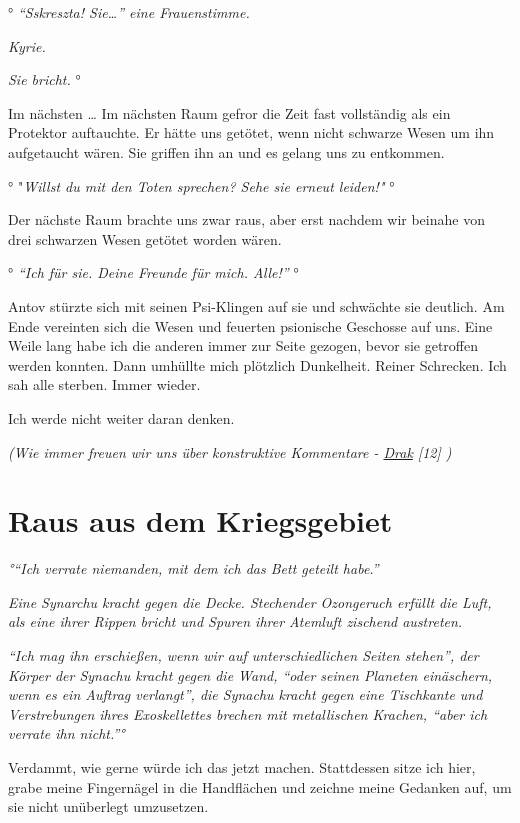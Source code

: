 \documentclass[11pt]{scrartcl}
\begin{document}
° \emph{``Sskreszta! Sie\ldots{}'' eine Frauenstimme.}

\emph{Kyrie.}

\emph{Sie bricht.} °

Im nächsten \ldots{} Im nächsten Raum gefror die Zeit fast vollständig
als ein Protektor auftauchte. Er hätte uns getötet, wenn nicht schwarze
Wesen um ihn aufgetaucht wären. Sie griffen ihn an und es gelang uns zu
entkommen.

° "\emph{Willst du mit den Toten sprechen? Sehe sie erneut leiden!"} °

Der nächste Raum brachte uns zwar raus, aber erst nachdem wir beinahe
von drei schwarzen Wesen getötet worden wären.

° \emph{``Ich für sie. Deine Freunde für mich. Alle!''} °

Antov stürzte sich mit seinen Psi-Klingen auf sie und schwächte sie
deutlich. Am Ende vereinten sich die Wesen und feuerten psionische
Geschosse auf uns. Eine Weile lang habe ich die anderen immer zur Seite
gezogen, bevor sie getroffen werden konnten. Dann umhüllte mich
plötzlich Dunkelheit. Reiner Schrecken. Ich sah alle sterben. Immer
wieder.

Ich werde nicht weiter daran denken.

\emph{(Wie immer freuen wir uns über konstruktive Kommentare -
\href{http://1w6.org/uzanto/drak}{Drak} {[}12{]} )}

\section{Raus aus dem Kriegsgebiet}

\emph{°``Ich verrate niemanden, mit dem ich das Bett geteilt habe.''}

\emph{Eine Synarchu kracht gegen die Decke. Stechender Ozongeruch
erfüllt die Luft, als eine ihrer Rippen bricht und Spuren ihrer Atemluft
zischend austreten.}

\emph{``Ich mag ihn erschießen, wenn wir auf unterschiedlichen Seiten
stehen'', der Körper der Synachu kracht gegen die Wand, ``oder seinen
Planeten einäschern, wenn es ein Auftrag verlangt'', die Synachu kracht
gegen eine Tischkante und Verstrebungen ihres Exoskellettes brechen mit
metallischen Krachen, ``aber ich verrate ihn nicht.''°}

Verdammt, wie gerne würde ich das jetzt machen. Stattdessen sitze ich
hier, grabe meine Fingernägel in die Handflächen und zeichne meine
Gedanken auf, um sie nicht unüberlegt umzusetzen.
\end{document}
